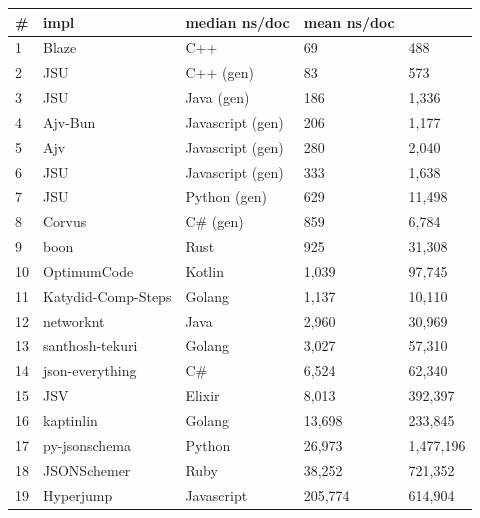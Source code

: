 \begin{tabular}{ll|l|ll}
\# & impl & median ns/doc & mean ns/doc \\
\hline
1 & Blaze & C++ & 69 & 488 \\
2 & JSU & C++ (gen) & 83 & 573 \\
3 & JSU & Java (gen) & 186 & 1,336 \\
4 & Ajv-Bun & Javascript (gen) & 206 & 1,177 \\
5 & Ajv & Javascript (gen) & 280 & 2,040 \\
6 & JSU & Javascript (gen) & 333 & 1,638 \\
7 & JSU & Python (gen) & 629 & 11,498 \\
8 & Corvus & C\# (gen) & 859 & 6,784 \\
9 & boon & Rust & 925 & 31,308 \\
10 & OptimumCode & Kotlin & 1,039 & 97,745 \\
11 & Katydid-Comp-Steps & Golang & 1,137 & 10,110 \\
12 & networknt & Java & 2,960 & 30,969 \\
13 & santhosh-tekuri & Golang & 3,027 & 57,310 \\
14 & json-everything & C\# & 6,524 & 62,340 \\
15 & JSV & Elixir & 8,013 & 392,397 \\
16 & kaptinlin & Golang & 13,698 & 233,845 \\
17 & py-jsonschema & Python & 26,973 & 1,477,196 \\
18 & JSONSchemer & Ruby & 38,252 & 721,352 \\
19 & Hyperjump & Javascript & 205,774 & 614,904 \\
\end{tabular}
